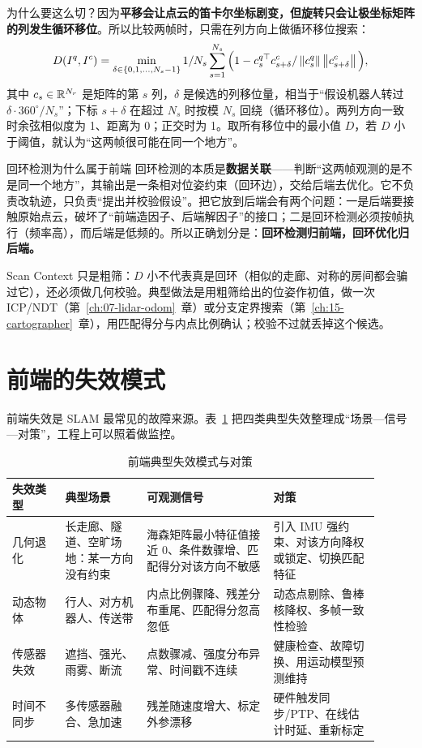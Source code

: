 为什么要这么切？因为\textbf{平移会让点云的笛卡尔坐标剧变，但旋转只会让极坐标矩阵的列发生循环移位}。所以比较两帧时，只需在列方向上做循环移位搜索：
\begin{equation}
D(I^{q},I^{c})=\min_{\delta\in\{0,1,\dots,N_s-1\}}
1/N_s\sum_{s=1}^{N_s}\Big(1-c^{q\top}_{s}c^{c}_{s+\delta}/\left\lVert c^{q}_{s} \right\rVert\left\lVert c^{c}_{s+\delta} \right\rVert\Big),
\label{eq:12-sc-distance}
\end{equation}
其中 $c_s\in\mathbb{R}^{N_r}$ 是矩阵的第 $s$ 列，$\delta$ 是候选的列移位量，相当于``假设机器人转过 $\delta\cdot360^{\circ}/N_s$''；下标 $s+\delta$ 在超过 $N_s$ 时按模 $N_s$ 回绕（循环移位）。两列方向一致时余弦相似度为 1、距离为 0；正交时为 1。取所有移位中的最小值 $D$，若 $D$ 小于阈值，就认为``这两帧很可能在同一个地方''。

\begin{keybox}{回环检测为什么属于前端}
回环检测的本质是\textbf{数据关联}——判断``这两帧观测的是不是同一个地方''，其输出是一条相对位姿约束（回环边），交给后端去优化。它不负责改轨迹，只负责``提出并校验假设''。把它放到后端会有两个问题：一是后端要接触原始点云，破坏了``前端造因子、后端解因子''的接口；二是回环检测必须按帧执行（频率高），而后端是低频的。所以正确划分是：\textbf{回环检测归前端，回环优化归后端。}
\end{keybox}

Scan Context 只是粗筛：$D$ 小不代表真是回环（相似的走廊、对称的房间都会骗过它），还必须做几何校验。典型做法是用粗筛给出的位姿作初值，做一次 ICP/NDT（第~\ref{ch:07-lidar-odom}~章）或分支定界搜索（第~\ref{ch:15-cartographer}~章），用匹配得分与内点比例确认；校验不过就丢掉这个候选。

\section{前端的失效模式}\label{sec:12-fail}

前端失效是 SLAM 最常见的故障来源。表~\ref{tab:12-fail} 把四类典型失效整理成``场景—信号—对策''，工程上可以照着做监控。

\begin{table}[htbp]
  \centering
  \caption{前端典型失效模式与对策}\label{tab:12-fail}
  \footnotesize
  \begin{tabular}{p{0.13\linewidth}p{0.20\linewidth}p{0.31\linewidth}p{0.26\linewidth}}
    \toprule
    失效类型 & 典型场景 & 可观测信号 & 对策 \\
    \midrule
    几何退化 & 长走廊、隧道、空旷场地：某一方向没有约束 & 海森矩阵最小特征值接近 0、条件数骤增、匹配得分对该方向不敏感 & 引入 IMU 强约束、对该方向降权或锁定、切换匹配特征 \\
    动态物体 & 行人、对方机器人、传送带 & 内点比例骤降、残差分布重尾、匹配得分忽高忽低 & 动态点剔除、鲁棒核降权、多帧一致性检验 \\
    传感器失效 & 遮挡、强光、雨雾、断流 & 点数骤减、强度分布异常、时间戳不连续 & 健康检查、故障切换、用运动模型预测维持 \\
    时间不同步 & 多传感器融合、急加速 & 残差随速度增大、标定外参漂移 & 硬件触发同步/PTP、在线估计时延、重新标定 \\
    \bottomrule
  \end{tabular}
\end{table}

